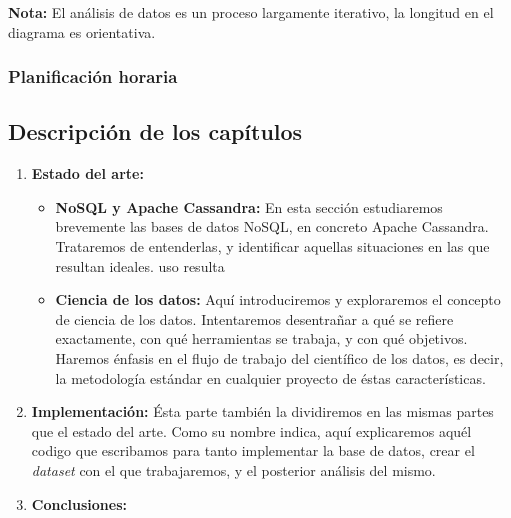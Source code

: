 \begin{center}
  \textbf{Nota: } El análisis de datos es un proceso largamente iterativo, la
  longitud en el diagrama es orientativa.
\end{center}


\subsubsection{Planificación horaria}
\label{subsubsec:hores}

\subsection{Descripción de los capítulos}
\label{subsec:chaps}


\begin{enumerate}
  \item \textbf{Estado del arte: }
    \begin{itemize}
      \item \textbf{NoSQL y Apache Cassandra: } En esta sección estudiaremos
        brevemente las bases de datos NoSQL, en concreto Apache Cassandra.
        Trataremos de entenderlas, y identificar aquellas situaciones en las que
        resultan ideales.
        uso resulta
      \item \textbf{Ciencia de los datos: } Aquí introduciremos y exploraremos el
        concepto de ciencia de los datos. Intentaremos desentrañar a qué se refiere
        exactamente, con qué herramientas se trabaja, y con qué objetivos.
        Haremos énfasis en el flujo de trabajo del científico de los datos, es
        decir, la metodología estándar en cualquier proyecto de éstas características.

    \end{itemize}
  \item \textbf{Implementación: }  Ésta parte también la dividiremos en las
    mismas partes que el estado del arte. Como su nombre indica, aquí
    explicaremos aquél codigo que escribamos para tanto implementar la base de
    datos, crear el \emph{dataset} con el que trabajaremos, y el posterior
    análisis del mismo.
  \item \textbf{Conclusiones: } 
\end{enumerate}
\clearpage
